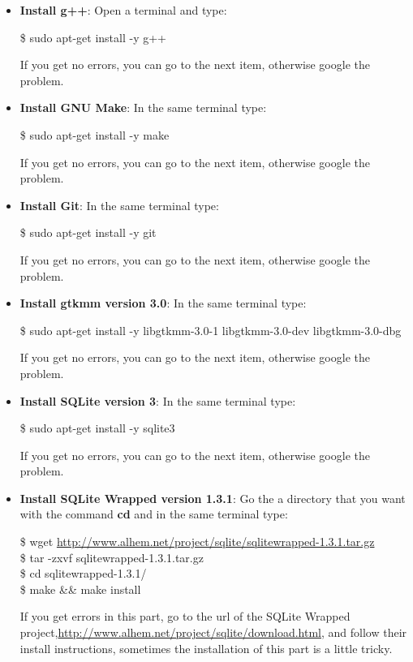 \documentclass[pdftex,11pt,a4paper,titlepage]{report}
\begin{document}
\begin{itemize}
\item \textbf{Install g++}: Open a terminal and type:
\begin{framed}
\$ sudo apt-get install -y g++
\end{framed}
If you get no errors, you can go to the next item, otherwise google the problem.

\item \textbf{Install GNU Make}: In the same terminal type:
\begin{framed}
\$ sudo apt-get install -y make
\end{framed}
If you get no errors, you can go to the next item, otherwise google the problem.

\item \textbf{Install Git}: In the same terminal type:
\begin{framed}
\$ sudo apt-get install -y git
\end{framed}
If you get no errors, you can go to the next item, otherwise google the problem.

\item \textbf{Install gtkmm version 3.0}: In the same terminal type:
\begin{framed}
\$ sudo apt-get install -y libgtkmm-3.0-1 libgtkmm-3.0-dev libgtkmm-3.0-dbg
\end{framed}
If you get no errors, you can go to the next item, otherwise google the problem.

\item \textbf{Install SQLite version 3}: In the same terminal type:
\begin{framed}
\$ sudo apt-get install -y sqlite3
\end{framed}
If you get no errors, you can go to the next item, otherwise google the problem.

\item \textbf{Install SQLite Wrapped version 1.3.1}: Go the a directory that you want with the command \textbf{cd} and in the same terminal type:
\begin{framed}
\$ wget \url{http://www.alhem.net/project/sqlite/sqlitewrapped-1.3.1.tar.gz} \\
\$ tar -zxvf sqlitewrapped-1.3.1.tar.gz \\
\$ cd sqlitewrapped-1.3.1/ \\
\$ make \&\& make install
\end{framed}
If you get errors in this part, go to the url of the SQLite Wrapped project,\url{http://www.alhem.net/project/sqlite/download.html}, and follow their install instructions, sometimes the installation of this part is a little tricky. 


\end{itemize}
\end{document}
